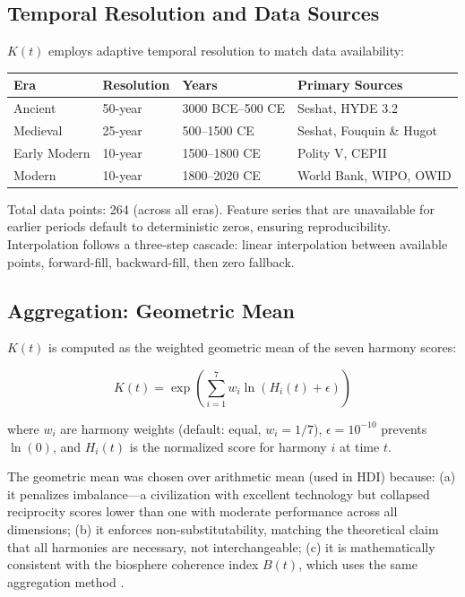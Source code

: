 \documentclass[10pt,letterpaper]{article}
\newcommand{\kt}{$K(t)$}
\begin{document}
\subsection*{Temporal Resolution and Data Sources}

\kt{} employs adaptive temporal resolution to match data availability:

\begin{center}
\begin{tabular}{llll}
\toprule
Era & Resolution & Years & Primary Sources \\
\midrule
Ancient & 50-year & 3000 BCE--500 CE & Seshat, HYDE 3.2 \\
Medieval & 25-year & 500--1500 CE & Seshat, Fouquin \& Hugot \\
Early Modern & 10-year & 1500--1800 CE & Polity V, CEPII \\
Modern & 10-year & 1800--2020 CE & World Bank, WIPO, OWID \\
\bottomrule
\end{tabular}
\end{center}

Total data points: 264 (across all eras). Feature series that are
unavailable for earlier periods default to deterministic zeros, ensuring
reproducibility. Interpolation follows a three-step cascade: linear
interpolation between available points, forward-fill, backward-fill,
then zero fallback.

\subsection*{Aggregation: Geometric Mean}

\kt{} is computed as the weighted geometric mean of the seven harmony scores:

\begin{equation}
K(t) = \exp\left(\sum_{i=1}^{7} w_i \ln(H_i(t) + \epsilon)\right)
\end{equation}

where $w_i$ are harmony weights (default: equal, $w_i = 1/7$),
$\epsilon = 10^{-10}$ prevents $\ln(0)$, and $H_i(t)$ is the
normalized score for harmony $i$ at time $t$.

The geometric mean was chosen over arithmetic mean (used in HDI) because:
(a) it penalizes imbalance---a civilization with excellent technology but
collapsed reciprocity scores lower than one with moderate performance
across all dimensions; (b) it enforces non-substitutability, matching
the theoretical claim that all harmonies are necessary, not interchangeable;
(c) it is mathematically consistent with the biosphere coherence index
$B(t)$, which uses the same aggregation method \cite{stoltz2026bt}.
\end{document}
